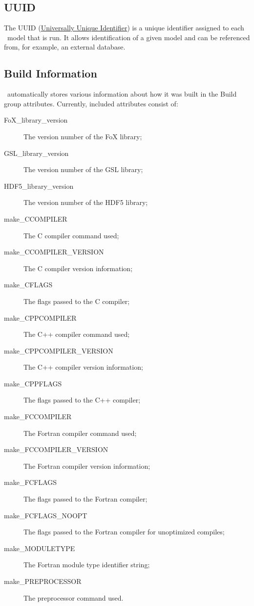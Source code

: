 \subsection{UUID}\label{sec:UUID}

The UUID (\href{https://secure.wikimedia.org/wikipedia/en/wiki/Universally_unique_identifier}{Universally Unique Identifier}) is a unique identifier assigned to each \glc\ model that is run. It allows identification of a given model and can be referenced from, for example, an external database.

\subsection{Build Information}\label{sec:BuildInformation}

\glc\ automatically stores various information about how it was built in the {\normalfont \ttfamily Build} group attributes. Currently, included attributes consist of:
\begin{description}
\item[{\normalfont \ttfamily FoX\_library\_version}] The version number of the FoX library;
\item[{\normalfont \ttfamily GSL\_library\_version}] The version number of the GSL library;
\item[{\normalfont \ttfamily HDF5\_library\_version}] The version number of the HDF5 library;
\item[{\normalfont \ttfamily make\_CCOMPILER}] The C compiler command used;
\item[{\normalfont \ttfamily make\_CCOMPILER\_VERSION}] The C compiler version information;
\item[{\normalfont \ttfamily make\_CFLAGS}] The flags passed to the C compiler;
\item[{\normalfont \ttfamily make\_CPPCOMPILER}] The C++ compiler command used;
\item[{\normalfont \ttfamily make\_CPPCOMPILER\_VERSION}] The C++ compiler version information;
\item[{\normalfont \ttfamily make\_CPPFLAGS}] The flags passed to the C++ compiler;
\item[{\normalfont \ttfamily make\_FCCOMPILER}] The Fortran compiler command used;
\item[{\normalfont \ttfamily make\_FCCOMPILER\_VERSION}] The Fortran compiler version information;
\item[{\normalfont \ttfamily make\_FCFLAGS}] The flags passed to the Fortran compiler;
\item[{\normalfont \ttfamily make\_FCFLAGS\_NOOPT}] The flags passed to the Fortran compiler for unoptimized compiles;
\item[{\normalfont \ttfamily make\_MODULETYPE}] The Fortran module type identifier string;
\item[{\normalfont \ttfamily make\_PREPROCESSOR}] The preprocessor command used.
\end{description}

